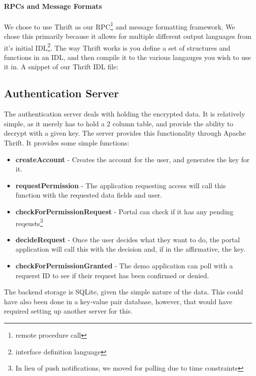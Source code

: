 \documentclass[letterpaper,twocolumn,10pt]{article}
\begin{document}
\paragraph{RPCs and Message Formats}
    We chose to use Thrift\cite{thrift} as our RPC\footnote{remote procedure call} and message formatting framework. We chose this primarily because it allows for multiple different output languages from it's initial IDL\footnote{interface definition language}. The way Thrift works is you define a set of structures and functions in an IDL, and then compile it to the various langauges you wish to use it in. A snippet of our Thrift IDL file:

\begin{minipage}{\linewidth}

\end{minipage}

\subsection{Authentication Server}
    The authentication server deals with holding the encrypted data. It is relatively simple, as it merely has to hold a 2 column table, and provide the ability to decrypt with a given key. The server provides this functionality through Apache Thrift\cite{thrift}. It provides some simple functions:
    \begin{itemize}
        \item \textbf{createAccount} - Creates the account for the user, and generates the key for it.
        \item \textbf{requestPermission} - The application requesting access will call this function with the requested data fields and user.
        \item \textbf{checkForPermissionRequest} - Portal can check if it has any pending reqeusts\footnote{In lieu of push notifications, we moved for polling due to time constraints} 
        \item \textbf{decideRequest} - Once the user decides what they want to do, the portal application will call this with the decision and, if in the affirmative, the key.
        \item \textbf{checkForPermissionGranted} - The demo application can poll with a requerst ID to see if their request has been confirmed or denied.
    \end{itemize}

The backend storage is SQLite, given the simple nature of the data. This could have also been done in a key-value pair database, however, that would have required setting up another server for this.
\end{document}
